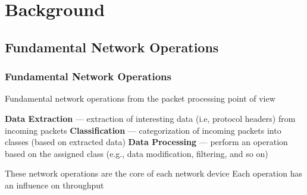 \section{Background}
\subsection*{Fundamental Network Operations}
\begin{frame} %
    \frametitle{Fundamental Network Operations}
    \begin{itemize}
       \fitem Fundamental network operations from the packet processing point of view
       \begin{enumerate}
           \fitem \textbf{Data Extraction} --- extraction of interesting data (i.e, protocol headers) from incoming packets
           \fitem \textbf{Classification} --- categorization of incoming packets into classes (based on extracted data)
           \fitem \textbf{Data Processing} --- perform an operation based on the assigned class (e.g., data modification, filtering, and so on)
        \end{enumerate}

        \fitem These network operations are the core of each network device
        \fitem Each operation has an influence on throughput        
    \end{itemize}
\end{frame}

